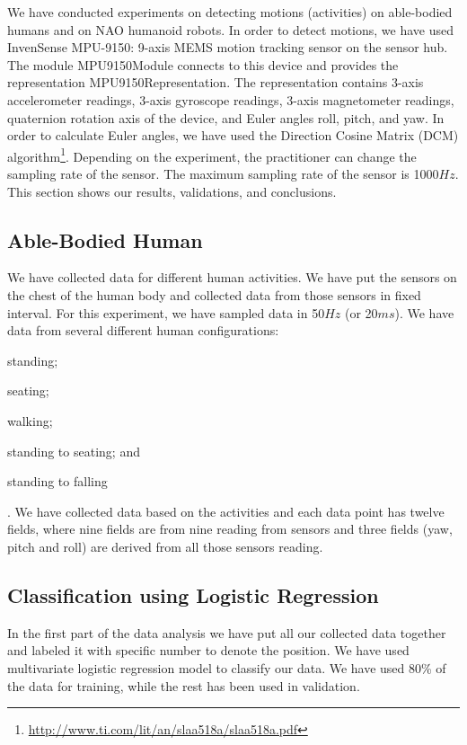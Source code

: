 \documentclass[letterpaper]{article}
\begin{document}
We have conducted experiments on detecting motions (activities) on able-bodied humans and on NAO
humanoid robots. In order to detect motions, we have used InvenSense MPU-9150: 9-axis MEMS
motion tracking sensor on the sensor hub. The module {\sf MPU9150Module} connects to this device
and provides the representation {\sf MPU9150Representation}. The representation contains
3-axis accelerometer readings, 3-axis gyroscope readings, 3-axis magnetometer readings, quaternion
rotation axis of the device, and Euler angles roll, pitch, and yaw.  In order to calculate Euler
angles, we have used the Direction Cosine Matrix (DCM)
algorithm\footnote{\url{http://www.ti.com/lit/an/slaa518a/slaa518a.pdf}}.  Depending on the
experiment, the practitioner can change the sampling rate of the sensor.  The maximum sampling rate
of the sensor is 1000$Hz$. This section shows our results, validations, and conclusions.

\subsection{Able-Bodied Human}

We have collected data for different human activities. We have put the sensors on the chest of the
human body and collected data from those sensors in fixed interval. For this experiment, we have
sampled data in 50$Hz$ (or 20$ms$). We have data from several different human configurations:
\begin{inparaenum}[(1)] \item standing; \item seating; \item walking; \item standing to seating;
and \item standing to falling\end{inparaenum}. We have collected data based on the activities and
each data point has twelve fields, where nine fields are from nine reading from sensors and three
fields (yaw, pitch and roll) are derived from all those sensors reading.

\subsection*{Classification using Logistic Regression}

In the first part of the data analysis we have put all our collected data together and labeled it
with specific number to denote the position. We have used multivariate logistic regression model to
classify our data. We have used 80\% of the data for training, while the rest has been used
in validation.
\end{document}
